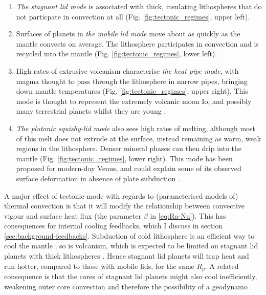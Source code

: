 \begin{enumerate}
\item \textit{The stagnant lid mode} is associated with thick, insulating lithospheres that do not particpate in convection at all (Fig. \ref{fig:tectonic_regimes}, upper left).
\item Surfaces of planets in \textit{the mobile lid mode} move about as quickly as the mantle convects on average. The lithosphere participates in convection and is recycled into the mantle (Fig. \ref{fig:tectonic_regimes}, lower left). 
\item High rates of extrusive volcanism characterise \textit{the heat pipe mode}, with magma thought to pass through the lithosphere in narrow pipes, bringing down mantle temperatures (Fig. \ref{fig:tectonic_regimes}, upper right). This mode is thought to represent the extremely volcanic moon Io, and possibly many terrestrial planets whilst they are young \citep{moore_heatpipe_2013, moore_heatpipe_2017}.
\item \textit{The plutonic squishy-lid mode} also sees high rates of melting, although most of this melt does not extrude at the surface, instead remaining as warm, weak regions in the lithosphere. Denser mineral phases can then drip into the mantle (Fig. \ref{fig:tectonic_regimes}, lower right). This mode has been proposed for modern-day Venus, and could explain some of its observed surface deformation in absence of plate subduction \citep{lourenco_plutonicsquishy_2017, lourenco_efficient_2018, lourenco_plutonicsquishy_2020}.
\end{enumerate} 

A major effect of tectonic mode with regards to (parameterised models of) thermal convection is that it will modify the relationship between convective vigour and surface heat flux (the parameter $\beta$ in \eqref{eq:Ra-Nu}). This has consequences for internal cooling feedbacks, which I discuss in section \ref{sec:background-feedbacks}. Subduction of cold lithosphere is an efficient way to cool the mantle \citep{breuer_dynamics_2015}; so is volcanism, which is expected to be limited on stagnant lid planets with thick lithospheres  \citep{oneill_geological_2007, kite2009geodynamics, noack2014can, noack_volcanism_2017}. Hence stagnant lid planets will trap heat and run hotter, compared to those with mobile lids, for the same $R_p$. A related consequence is that the cores of stagnant lid planets might also cool inefficiently, weakening outer core convection and therefore the possibility of a geodynamo \citep{nimmo_why_2002, driscoll_thermal_2014}. 


